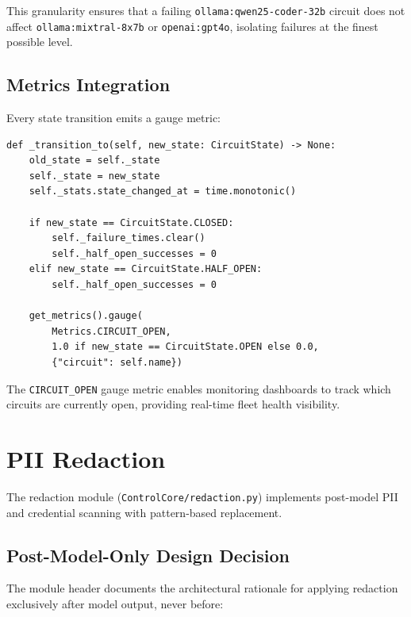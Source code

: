 \documentclass[11pt,a4paper]{article}
\theoremstyle{plain}
\theoremstyle{definition}
\begin{document}
This granularity ensures that a failing \texttt{ollama:qwen25-coder-32b} circuit
does not affect \texttt{ollama:mixtral-8x7b} or
\texttt{openai:gpt4o}, isolating failures at the finest possible level.

\subsection{Metrics Integration}

Every state transition emits a gauge metric:

\begin{lstlisting}[style=pythonstyle, caption={Circuit breaker metrics emission from \texttt{circuit\_breaker.py}}]
def _transition_to(self, new_state: CircuitState) -> None:
    old_state = self._state
    self._state = new_state
    self._stats.state_changed_at = time.monotonic()

    if new_state == CircuitState.CLOSED:
        self._failure_times.clear()
        self._half_open_successes = 0
    elif new_state == CircuitState.HALF_OPEN:
        self._half_open_successes = 0

    get_metrics().gauge(
        Metrics.CIRCUIT_OPEN,
        1.0 if new_state == CircuitState.OPEN else 0.0,
        {"circuit": self.name})
\end{lstlisting}

The \texttt{CIRCUIT\_OPEN} gauge metric enables monitoring dashboards to track
which circuits are currently open, providing real-time fleet health visibility.

\section{PII Redaction}
\label{sec:redaction}

The redaction module (\texttt{ControlCore/redaction.py}) implements post-model
PII and credential scanning with pattern-based replacement.

\subsection{Post-Model-Only Design Decision}

The module header documents the architectural rationale for applying redaction
exclusively after model output, never before:
\end{document}
